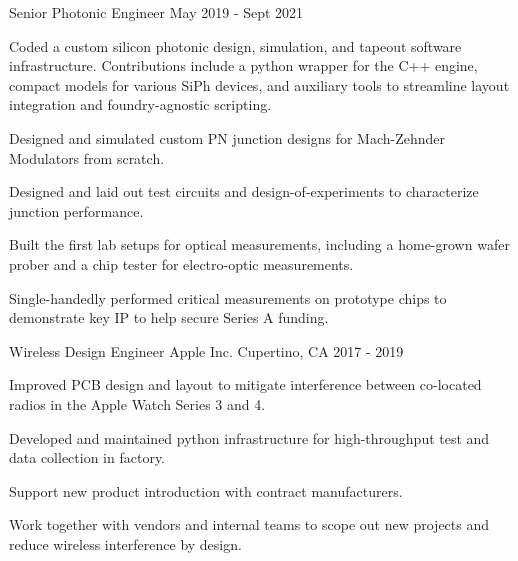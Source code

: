 \begin{cventries}
  \cventry
    {Senior Photonic Engineer} %
    {}
    {} %
    {May 2019 - Sept 2021} %
    {
      \begin{cvitems} %
        \item {Coded a custom silicon photonic design, simulation, and tapeout software infrastructure. Contributions include a python wrapper for the C++ engine, compact models for various SiPh devices, and auxiliary tools to streamline layout integration and foundry-agnostic scripting.}
        \item {Designed and simulated custom PN junction designs for Mach-Zehnder Modulators from scratch.}
        \item {Designed and laid out test circuits and design-of-experiments to characterize junction performance.}
        \item {Built the first lab setups for optical measurements, including a home-grown wafer prober and a chip tester for electro-optic measurements.}
        \item {Single-handedly performed critical measurements on prototype chips to demonstrate key IP to help secure Series A funding.}
      \end{cvitems}
    }
    
  \cventry
    {Wireless Design Engineer} %
    {Apple Inc. }
    {Cupertino, CA} %
    {2017 - 2019} %
    {
      \begin{cvitems} %
        \item {Improved PCB design and layout to mitigate interference between co-located radios in the Apple Watch Series 3 and 4.}
        \item {Developed and maintained python infrastructure for high-throughput test and data collection in factory.}
        \item {Support new product introduction with contract manufacturers.}
        \item {Work together with vendors and internal teams to scope out new projects and reduce wireless interference by design.}
      \end{cvitems}
    }
    

\end{cventries}

